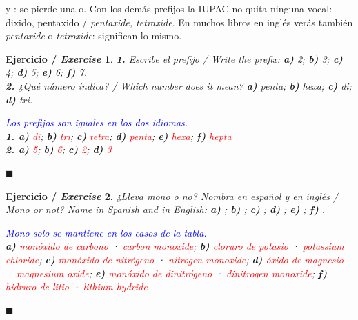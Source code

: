 \documentclass[12pt]{article}
\theoremstyle{mygreennumbox}
\newtheorem{ejercicioT}{Ejercicio / \textit{Exercise}}[section]
\newenvironment{exercise}{\begin{eBoxmygreen}\begin{ejercicioT}}{\hfill{\color{mygreen}\tiny\ensuremath{\blacksquare}}\end{ejercicioT}\end{eBoxmygreen}}
\newcommand{\en}[1]{\textit{#1}}
\begin{document}
\begin{marker}
     y \en{}: se pierde una o. Con los demás prefijos la IUPAC no quita ninguna vocal: dixido, pentaxido / \en{pentaxide, tetra\negrita{o}xide}. En muchos libros en inglés verás también \en{pentoxide} o \en{tetroxide}: significan lo mismo.
\end{marker}

\begin{exercise}
    \textbf{1.} Escribe el prefijo / \en{Write the prefix}: \textbf{a)} 2; \textbf{b)} 3; \textbf{c)} 4; \textbf{d)} 5; \textbf{e)} 6; \textbf{f)} 7.\\
    \textbf{2.} ¿Qué número indica? / \en{Which number does it mean?} \textbf{a)} penta; \textbf{b)} hexa; \textbf{c)} di; \textbf{d)} tri.
    \begin{solu}
        \textcolor{blue}{Los prefijos son iguales en los dos idiomas.}\\
        \textbf{1. a)} \textcolor{red}{di}; \textbf{b)} \textcolor{red}{tri}; \textbf{c)} \textcolor{red}{tetra}; \textbf{d)} \textcolor{red}{penta}; \textbf{e)} \textcolor{red}{hexa}; \textbf{f)} \textcolor{red}{hepta}\\
        \textbf{2. a)} \textcolor{red}{5}; \textbf{b)} \textcolor{red}{6}; \textbf{c)} \textcolor{red}{2}; \textbf{d)} \textcolor{red}{3}
    \end{solu}
\end{exercise}

\begin{exercise}
    ¿Lleva mono o no? Nombra en español y en inglés / \en{Mono or not? Name in Spanish and in English}: \textbf{a)} ; \textbf{b)} ; \textbf{c)} ; \textbf{d)} ; \textbf{e)} ; \textbf{f)} .
    \begin{solu}
        \textcolor{blue}{Mono solo se mantiene en los casos de la tabla.}\\
        \textbf{a)} \textcolor{red}{monóxido de carbono} · \textcolor{red}{\en{carbon monoxide}}; \textbf{b)} \textcolor{red}{cloruro de potasio} · \textcolor{red}{\en{potassium chloride}}; \textbf{c)} \textcolor{red}{monóxido de nitrógeno} · \textcolor{red}{\en{nitrogen monoxide}}; \textbf{d)} \textcolor{red}{óxido de magnesio} · \textcolor{red}{\en{magnesium oxide}}; \textbf{e)} \textcolor{red}{monóxido de dinitrógeno} · \textcolor{red}{\en{dinitrogen monoxide}}; \textbf{f)} \textcolor{red}{hidruro de litio} · \textcolor{red}{\en{lithium hydride}}
    \end{solu}
\end{exercise}
\end{document}
